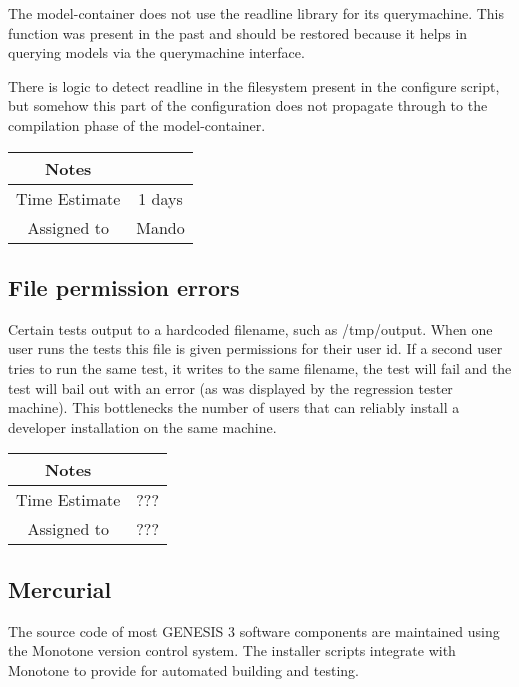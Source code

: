 \documentclass[12pt]{article}
\begin{document}
The model-container does not use the readline library for its
querymachine.  This function was present in the past and should be
restored because it helps in querying models via the querymachine
interface.

There is logic to detect readline in the filesystem present in the
configure script, but somehow this part of the configuration does not
propagate through to the compilation phase of the model-container.

{
  \vspace{5mm}
  \centering
  \begin{tabular}{|c|c|}
    \hline
    Notes
    & \\
    \hline
    Time Estimate
    & 1 days \\
    \hline
    Assigned to
    & Mando \\
    \hline
  \end{tabular}
}


\subsection{File permission errors}

Certain tests output to a hardcoded filename, such as /tmp/output.
When one user runs the tests this file is given permissions for their
user id. If a second user tries to run the same test, it writes to the
same filename, the test will fail and the test will bail out with an
error (as was displayed by the regression tester machine).  This
bottlenecks the number of users that can reliably install a developer
installation on the same machine.


{
  \vspace{5mm}
  \centering
  \begin{tabular}{|c|c|}
    \hline
    Notes
    &  \\
    \hline
    Time Estimate
    & ??? \\
    \hline
    Assigned to
    & ??? \\
    \hline
  \end{tabular}
}


\subsection{Mercurial}

The source code of most GENESIS 3 software components are maintained
using the Monotone version control system.  The installer scripts
integrate with Monotone to provide for automated building and testing.
\end{document}
